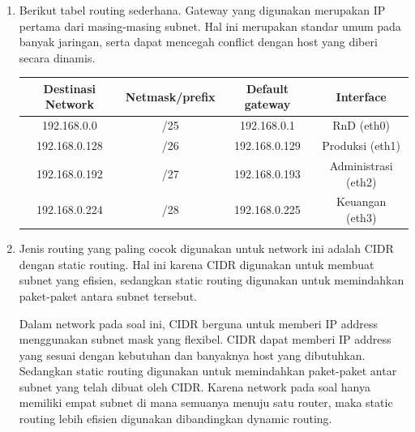 \begin{enumerate}
\begin{center}
    \end{center}
	\item Berikut tabel routing sederhana. Gateway yang digunakan merupakan
	IP pertama dari masing-masing subnet. Hal ini merupakan standar umum 
	pada banyak jaringan, serta dapat mencegah conflict dengan host yang 
	diberi secara dinamis.
	{\small
		\begin{center}
		\begin{tabular}{ |c|c|c|c| } 
			\hline
			Destinasi Network & Netmask/prefix & Default gateway & Interface \\
			\hline
			192.168.0.0 & /25 & 192.168.0.1 & RnD (eth0)  \\
			192.168.0.128 & /26 & 192.168.0.129 & Produksi (eth1)  \\
			192.168.0.192 & /27 & 192.168.0.193 & Administrasi (eth2)  \\
			192.168.0.224 & /28 & 192.168.0.225 & Keuangan (eth3)  \\
			\hline
		\end{tabular}
		\end{center}
	}
	\item Jenis routing yang paling cocok digunakan untuk network 
	ini adalah CIDR dengan static routing. Hal ini karena CIDR 
	digunakan untuk membuat subnet yang efisien, sedangkan 
	static routing digunakan untuk memindahkan paket-paket antara 
	subnet tersebut.

	Dalam network pada soal ini, CIDR berguna untuk memberi IP 
	address menggunakan subnet mask yang flexibel. CIDR dapat 
	memberi IP address yang sesuai dengan kebutuhan dan  
	banyaknya host yang dibutuhkan. Sedangkan static routing 
	digunakan untuk memindahkan paket-paket antar subnet yang 
	telah dibuat oleh CIDR. Karena network pada soal hanya 
	memiliki empat subnet di mana semuanya menuju satu router, 
	maka static routing lebih efisien digunakan dibandingkan
	dynamic routing.
\end{enumerate}